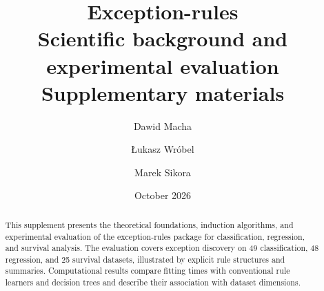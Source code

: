 \documentclass[11pt,a4paper]{article}
\title{Exception-rules\\Scientific background and experimental evaluation\\\large Supplementary materials}
\author{Dawid Macha \and Łukasz Wróbel \and Marek Sikora}
\date{October 2026}
\begin{document}
\maketitle
\begin{abstract}
This supplement presents the theoretical foundations, induction algorithms, and experimental evaluation of the exception-rules package for classification, regression, and survival analysis. The evaluation covers exception discovery on 49 classification, 48 regression, and 25 survival datasets, illustrated by explicit rule structures and summaries. Computational results compare fitting times with conventional rule learners and decision trees and describe their association with dataset dimensions.
\end{abstract}
\setcounter{tocdepth}{2}
\tableofcontents
\clearpage






\clearpage

\end{document}
